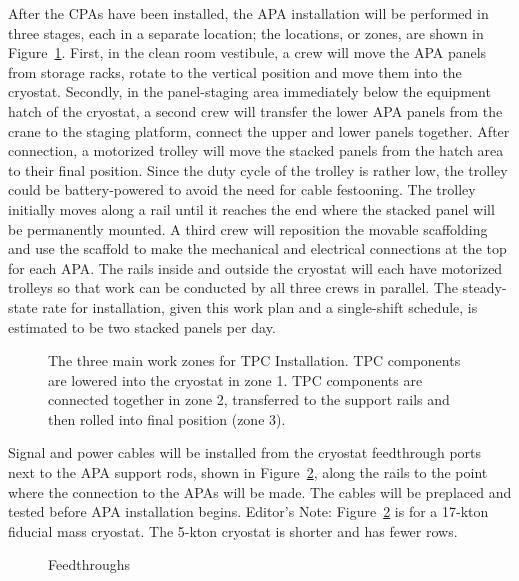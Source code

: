 After the CPAs have been installed, the APA installation will be performed in three stages, each in a separate location; the locations, or zones, are shown in Figure~\ref{fig:tpc-install-workzones}. First, in the clean room vestibule, a crew will move the APA panels from storage 
racks, rotate to the vertical position and move them into the cryostat. Secondly, in the panel-staging area immediately below the equipment hatch of the cryostat, a second crew will transfer the lower APA panels from the 
crane to the staging platform, connect the upper and lower panels together. After connection, a motorized trolley will move the stacked panels from the hatch area to their final position. Since the duty cycle of the trolley is rather low, the trolley could be battery-powered to 
avoid the need for cable festooning. The trolley initially moves along a rail until it reaches the end where the stacked panel will be permanently mounted. A third 
crew will reposition the movable scaffolding and use the scaffold to make the mechanical and electrical connections at the top for each APA. The rails inside and outside 
the cryostat will each have motorized trolleys so that work can be conducted by all three crews in parallel. The steady-state rate for installation, given this work plan and a single-shift schedule, is estimated to be two stacked panels per day. 

\begin{figure}[htbp]
\centering
\caption[The three main work zones for TPC Installation]{The three main work zones for TPC Installation. TPC components are lowered into the cryostat in zone 1. TPC components are connected together in zone 2, 
transferred to the support rails and then rolled into final position (zone 3).} 
\label{fig:tpc-install-workzones}
\end{figure}

Signal and power cables will be installed from the cryostat feedthrough ports next to the APA support rods, shown in Figure~\ref{fig:tpc-install-feedthroughs}, along the rails to the point where the connection to the APAs will be made. The cables will be 
preplaced and tested before APA installation begins.  Editor’s Note: Figure~\ref{fig:tpc-install-feedthroughs} is for a 17-kton fiducial mass cryostat. The 5-kton cryostat is shorter and has fewer rows.  

\begin{figure}[htbp]
\centering
\caption{Feedthroughs} 
\label{fig:tpc-install-feedthroughs}
\end{figure}


